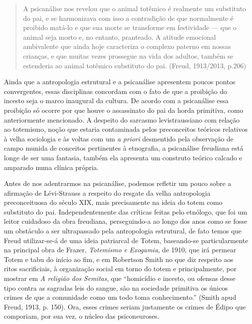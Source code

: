 \begin{quote}
A psicanálise nos revelou que o animal totêmico é realmente um
substituto do pai, e se harmonizava com isso a contradição de que
normalmente é proibido matá-lo e que sua morte se transforme em
festividade --- que o animal seja morto e, no entanto, pranteado. A
atitude emocional ambivalente que ainda hoje caracteriza o complexo
paterno em nossas crianças, e que muitas vezes prossegue na vida dos
adultos, também se estenderia ao animal totêmico substituto do pai.
(Freud, 1913/2013, p.206)
\end{quote}

Ainda que a antropologia estrutural e a psicanálise apresentem poucos
pontos convergentes, essas disciplinas concordam com o fato de que a
proibição do incesto seja o marco inaugural da cultura. De acordo com a
psicanálise essa proibição só ocorre por que houve o assassinato do pai
da horda primitiva, como anteriormente mencionado. A despeito do
sarcasmo levistraussiano com relação ao totemismo, noção que estaria
contaminada pelos preconceitos teóricos relativos à velha sociologia e
às voltas com um \emph{a priori} desmentido pela observação de campo
munida de conceitos pertinentes à etnografia, a psicanálise freudiana
está longe de ser uma fantasia, também ela apresenta um construto
teórico calcado e amparado numa clínica própria.

Antes de nos adentrarmos na psicanálise, podemos refletir um pouco sobre
a afirmação de Lévi-Strauss a respeito do resgate da velha antropologia
preconceituosa do século XIX, mais precisamente na ideia do totem como
substituto do pai. Independentemente das críticas feitas pelo etnólogo,
que foi um leitor cuidadoso da obra freudiana, perseguindo-a ao longo
dos anos como se fosse um obstáculo a ser ultrapassado pela antropologia
estrutural, de fato temos que Freud utilizar-se-á de uma ideia
patriarcal de Totem, baseando-se particularmente na principal obra de
Frazer, \emph{Totemismo e Exogamia}, de 1910, que irá permear Totem e
tabu do início ao fim, e em Robertson Smith no que diz respeito aos
ritos sacrificiais, à organização social em torno do totem e
principalmente, por mostrar em \emph{A religião dos Semitas}, que
``homicídio e incesto, ou ofensas desse tipo contra as sagradas leis do
sangue, são na sociedade primitiva os únicos crimes de que a comunidade
como um todo toma conhecimento.'' (Smith apud Freud, 1913, p. 150). Ora,
esses crimes seriam justamente os crimes de Édipo que comporiam, por sua
vez, o núcleo das psiconeuroses.

